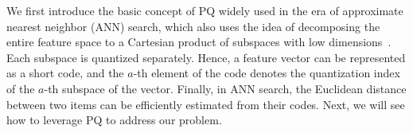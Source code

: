 We first  introduce the basic concept of PQ widely used in the era of approximate nearest neighbor (ANN) search, which also uses the idea of  decomposing the entire feature space to a Cartesian product of subspaces with low dimensions~\cite{}. Each subspace is quantized separately. Hence, a feature vector can be represented as a short code, and the $a$-th element of the code denotes the  quantization index of the $a$-th subspace of the vector. Finally, in ANN search,  the Euclidean distance between two items can be efficiently estimated from their codes. Next, we will see how to leverage PQ to address our problem.



